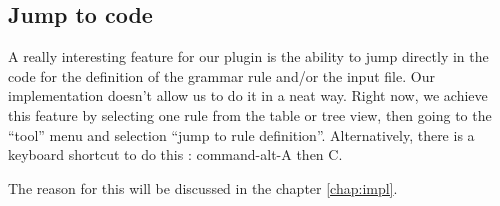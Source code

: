 	\subsection{Jump to code}

	A really interesting feature for our plugin is the ability to jump directly in the code for the definition of the grammar rule and/or the input file. Our implementation doesn't allow us to do it in a neat way. Right now, we achieve this feature by selecting one rule from the table or tree view, then going to the ``tool'' menu and selection ``jump to rule definition''. Alternatively, there is a keyboard shortcut to do this : command-alt-A then C.

	The reason for this will be discussed in the chapter \ref{chap:impl}.







